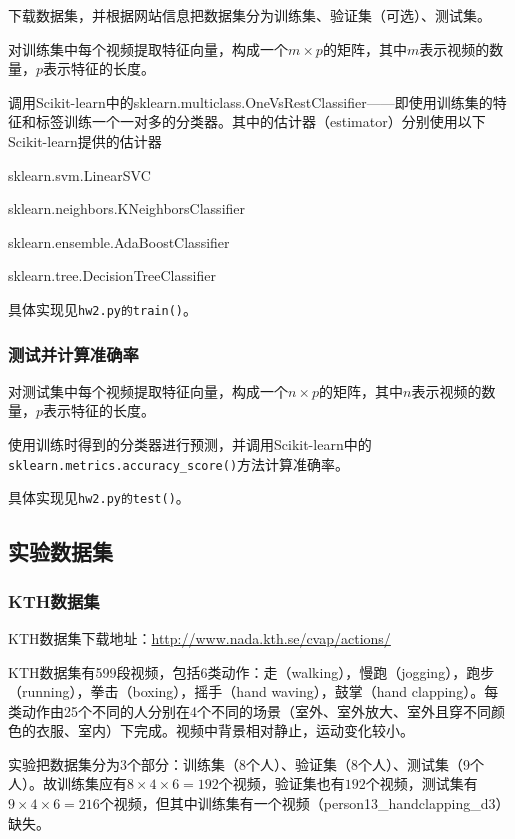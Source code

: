 \documentclass[a4paper, 12pt, UTF8]{article}
\begin{document}
下载数据集，并根据网站信息把数据集分为训练集、验证集（可选）、测试集。

对训练集中每个视频提取特征向量，构成一个$m \times p$的矩阵，其中$m$表示视频的数量，$p$表示特征的长度。

调用Scikit-learn中的sklearn.multiclass.OneVsRestClassifier\textsuperscript{\cite{ref3}}——即使用训练集的特征和标签训练一个一对多的分类器。其中的估计器（estimator）分别使用以下Scikit-learn提供的估计器

sklearn.svm.LinearSVC\textsuperscript{\cite{ref4}}

sklearn.neighbors.KNeighborsClassifier\textsuperscript{\cite{ref5}}

sklearn.ensemble.AdaBoostClassifier\textsuperscript{\cite{ref6}}

sklearn.tree.DecisionTreeClassifier\textsuperscript{\cite{ref7}}

具体实现见\lstinline{hw2.py的train()}。

\subsubsection{测试并计算准确率}

对测试集中每个视频提取特征向量，构成一个$n \times p$的矩阵，其中$n$表示视频的数量，$p$表示特征的长度。

使用训练时得到的分类器进行预测，并调用Scikit-learn中的\lstinline[language=Python]{sklearn.metrics.accuracy_score()}方法\textsuperscript{\cite{ref8}}计算准确率。

具体实现见\lstinline{hw2.py的test()}。


\subsection{实验数据集}

\subsubsection{KTH数据集}

KTH数据集下载地址：\url{http://www.nada.kth.se/cvap/actions/}

KTH数据集有599段视频，包括6类动作：走（walking），慢跑（jogging），跑步（running），拳击（boxing），摇手（hand waving），鼓掌（hand clapping）。每类动作由25个不同的人分别在4个不同的场景（室外、室外放大、室外且穿不同颜色的衣服、室内）下完成。视频中背景相对静止，运动变化较小。

实验把数据集分为3个部分：训练集（8个人）、验证集（8个人）、测试集（9个人）。故训练集应有$8 \times 4 \times 6 = 192$个视频，验证集也有$192$个视频，测试集有$9 \times 4 \times 6 = 216$个视频，但其中训练集有一个视频（person13\_handclapping\_d3）缺失。
\end{document}
